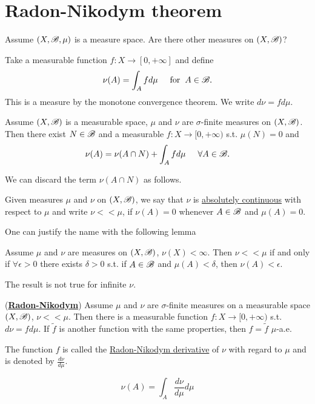 \section{Radon-Nikodym theorem}
Assume $(X,\mathscr{B},\mu)$ is a measure space. Are there other measures on $(X,\mathscr{B})$?
\begin{example}
    Take a measurable function $f:X\rightarrow [0,+\infty]$ and define $$\nu(A)=\int_A fd\mu \hspace{5mm}\text{for}\hspace{2mm} A\in \mathscr{B}.$$
    This is a measure by the monotone convergence theorem. We write $d\nu = fd\mu$.
\end{example}
\begin{proposition}
    Assume $(X,\mathscr{B})$ is a measurable space, $\mu$ and $\nu$ are $\sigma$-finite measures on $(X,\mathscr{B})$. Then there exist $ N\in \mathscr{B}$ and a measurable
    $f:X\rightarrow [0,+\infty)$ s.t. $\mu(N)=0$ and 
    $$\nu(A) = \nu(A\cap N)+\int_A fd\mu \hspace{5mm} \forall A\in\mathscr{B}.$$

\end{proposition}
We can discard the term $\nu(A\cap N)$ as follows.

\begin{definition}
    Given measures $\mu$ and $\nu$ on $(X,\mathscr{B})$, we say that $\nu$ is \underline{absolutely continuous} with respect to $\mu$ and write $\nu<<\mu$, if $\nu(A)=0$ whenever $A\in\mathscr{B}$ and $\mu(A)=0$.
\end{definition}
One can justify the name with the following lemma
\begin{lemma}
    Assume $\mu$ and $\nu$ are measures on $(X,\mathscr{B})$, $\nu(X)<\infty$. Then $\nu<<\mu$ if and only if $\forall \epsilon>0$ there exists $\delta>0 $ s.t. if $A\in\mathscr{B}$
    and $\mu(A)<\delta$, then $\nu(A)<\epsilon$.
\end{lemma}
\begin{remark}
    The result is not true for infinite $\nu$.
\end{remark}
\begin{theorem}(\underline{\textbf{Radon-Nikodym}})
    Assume $\mu$ and $\nu$ are $\sigma$-finite measures on a measurable space $(X,\mathscr{B})$, $\nu<<\mu$. Then there is a measurable function $f:X\rightarrow[0,+\infty)$ s.t. $d\nu = fd\mu$.
    If $\tilde f$ is another function with the same properties, then $f=\tilde f$  $\mu$-a.e.

    The function $f$ is called the \underline{Radon-Nikodym derivative} of $\nu$ with regard to $\mu$ and is denoted by $\frac{d\nu}{d\mu}$.

    \[\nu(A)=\int_A \frac{d\nu}{d\mu}d\mu\]

\end{theorem}

